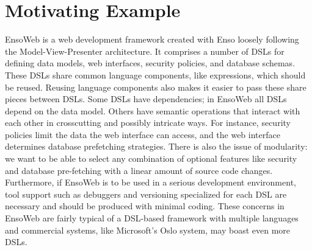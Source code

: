 \section{Motivating Example}


EnsoWeb is a web development framework created with Enso loosely following the Model-View-Presenter architecture. It comprises a number of DSLs for defining data models, web interfaces, security policies, and database schemas. These DSLs share common language components, like expressions, which should be reused. Reusing language components also makes it easier to pass these share pieces between DSLs. Some DSLs have dependencies; in EnsoWeb all DSLs depend on the data model. Others have semantic operations that interact with each other in crosscutting and possibly intricate ways. For instance, security policies limit the data the web interface can access, and the web interface determines database prefetching strategies. There is also the issue of modularity: we want to be able to select any combination of optional features like security and database pre-fetching with a linear amount of source code changes. Furthermore, if EnsoWeb is to be used in a serious development environment, tool support such as debuggers and versioning specialized for each DSL are necessary and should be produced with minimal coding. These concerns in EnsoWeb are fairly typical of a DSL-based framework with multiple languages and commercial systems, like Microsoft's Oslo system, may boast even more DSLs.


